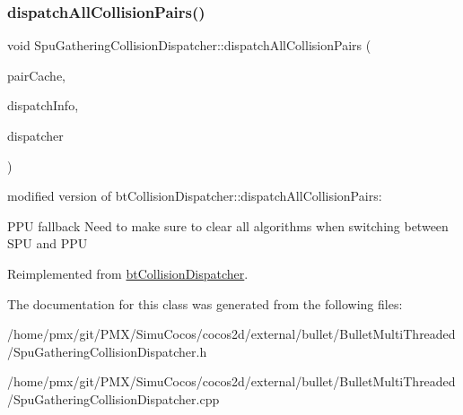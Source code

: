 \subsubsection{\texorpdfstring{dispatch\+All\+Collision\+Pairs()}{dispatchAllCollisionPairs()}}
{\footnotesize\ttfamily void Spu\+Gathering\+Collision\+Dispatcher\+::dispatch\+All\+Collision\+Pairs (\begin{DoxyParamCaption}\item[{\hyperlink{classbtOverlappingPairCache}{bt\+Overlapping\+Pair\+Cache} $\ast$}]{pair\+Cache,  }\item[{const \hyperlink{structbtDispatcherInfo}{bt\+Dispatcher\+Info} \&}]{dispatch\+Info,  }\item[{\hyperlink{classbtDispatcher}{bt\+Dispatcher} $\ast$}]{dispatcher }\end{DoxyParamCaption})\hspace{0.3cm}{\ttfamily [virtual]}}

modified version of bt\+Collision\+Dispatcher\+::dispatch\+All\+Collision\+Pairs\+:

P\+PU fallback Need to make sure to clear all \textquotesingle{}algorithms\textquotesingle{} when switching between S\+PU and P\+PU 

Reimplemented from \hyperlink{classbtCollisionDispatcher}{bt\+Collision\+Dispatcher}.



The documentation for this class was generated from the following files\+:\begin{DoxyCompactItemize}
\item 
/home/pmx/git/\+P\+M\+X/\+Simu\+Cocos/cocos2d/external/bullet/\+Bullet\+Multi\+Threaded/Spu\+Gathering\+Collision\+Dispatcher.\+h\item 
/home/pmx/git/\+P\+M\+X/\+Simu\+Cocos/cocos2d/external/bullet/\+Bullet\+Multi\+Threaded/Spu\+Gathering\+Collision\+Dispatcher.\+cpp\end{DoxyCompactItemize}
